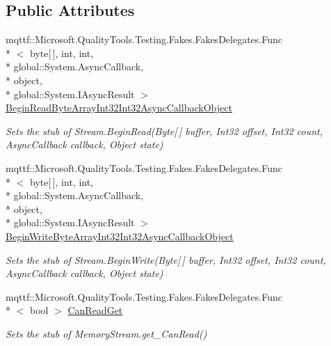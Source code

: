 \subsection*{Public Attributes}
\begin{DoxyCompactItemize}
\item 
mqttf\-::\-Microsoft.\-Quality\-Tools.\-Testing.\-Fakes.\-Fakes\-Delegates.\-Func\\*
$<$ byte\mbox{[}$\,$\mbox{]}, int, int, \\*
global\-::\-System.\-Async\-Callback, \\*
object, \\*
global\-::\-System.\-I\-Async\-Result $>$ \hyperlink{class_system_1_1_i_o_1_1_fakes_1_1_stub_memory_stream_ab5ba7bbab3f39cdf4de6f2596d5509dd}{Begin\-Read\-Byte\-Array\-Int32\-Int32\-Async\-Callback\-Object}
\begin{DoxyCompactList}\small\item\em Sets the stub of Stream.\-Begin\-Read(\-Byte\mbox{[}$\,$\mbox{]} buffer, Int32 offset, Int32 count, Async\-Callback callback, Object state)\end{DoxyCompactList}\item 
mqttf\-::\-Microsoft.\-Quality\-Tools.\-Testing.\-Fakes.\-Fakes\-Delegates.\-Func\\*
$<$ byte\mbox{[}$\,$\mbox{]}, int, int, \\*
global\-::\-System.\-Async\-Callback, \\*
object, \\*
global\-::\-System.\-I\-Async\-Result $>$ \hyperlink{class_system_1_1_i_o_1_1_fakes_1_1_stub_memory_stream_affb9564f1d44fd4d7d2100520c4a7d7b}{Begin\-Write\-Byte\-Array\-Int32\-Int32\-Async\-Callback\-Object}
\begin{DoxyCompactList}\small\item\em Sets the stub of Stream.\-Begin\-Write(\-Byte\mbox{[}$\,$\mbox{]} buffer, Int32 offset, Int32 count, Async\-Callback callback, Object state)\end{DoxyCompactList}\item 
mqttf\-::\-Microsoft.\-Quality\-Tools.\-Testing.\-Fakes.\-Fakes\-Delegates.\-Func\\*
$<$ bool $>$ \hyperlink{class_system_1_1_i_o_1_1_fakes_1_1_stub_memory_stream_a4b8373fa0755b49764eaa3c58facd272}{Can\-Read\-Get}
\begin{DoxyCompactList}\small\item\em Sets the stub of Memory\-Stream.\-get\-\_\-\-Can\-Read()\end{DoxyCompactList}\item 

\end{DoxyCompactItemize}
